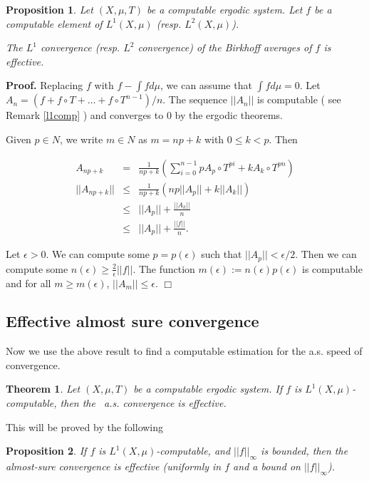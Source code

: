 \documentclass[copyright,creativecommons]{eptcs}
\newtheorem{theorem}{Theorem}
\newtheorem{proposition}{Proposition}
\numberwithin{equation}{section}
\begin{document}
\begin{proposition}
Let $(X,\mu ,T)$ be a computable ergodic system. Let $f$ be a computable
element of $L^{1}(X,\mu )$ (resp. $L^{2}(X,\mu )$).

The $L^1$ convergence (resp. $L^2$ convergence) of the Birkhoff averages of $f$ is effective.
\end{proposition}

{\bf Proof.}
Replacing $f$ with $f-\int fd\mu $, we can assume that $\int fd\mu =0$.
Let $A_{n}=(f+f\circ T+\ldots +f\circ T^{n-1})/n$. The sequence $||A_{n}||$
is computable ( see Remark \ref{l1comp} ) and converges to $0$ by the ergodic
theorems.

Given $p\in N$, we write $m\in N$ as $m=np+k$ with $0\leq k<p$. Then

\begin{eqnarray*}
A_{np+k} &=&\frac{1}{np+k}\left( \sum_{i=0}^{n-1}pA_{p}\circ
T^{pi}+kA_{k}\circ T^{pn}\right) \\
||A_{np+k}|| &\leq &\frac{1}{np+k}(np||A_{p}||+k||A_{k}||) \\
&\leq &||A_{p}||+\frac{||{A_{k}}||}{n} \\
&\leq &||{A_{p}}||+\frac{||{f}||}{n}.
\end{eqnarray*}

Let $\epsilon >0$. We can compute some $p=p(\epsilon )$ such that $||{A_{p}}||<\epsilon /2$. Then we can compute some $n(\epsilon )\geq \frac{2}{\epsilon }||{f}||$. The function $m(\epsilon ):=n(\epsilon )p(\epsilon )$ is
computable and for all $m\geq m(\epsilon )$, $||{A_{m}}||\leq \epsilon $.
$\Box$

\subsection{Effective almost sure convergence}

Now we use the above result to find a computable estimation for the a.s.
speed of convergence.

\begin{theorem}
\label{corollaryx}Let $(X,\mu ,T)$ be a computable ergodic system. If $f$ is
$L^{1}(X,\mu )$-computable, then the \ a.s. convergence is effective.
\end{theorem}

This will be proved by the following

\begin{proposition}
\label{theorem_ergodic_effective_as_convergence} If $f$ is $L^{1}(X,\mu )$-computable, and $||{f}||_{\infty }$ is bounded, then
the almost-sure convergence is effective (uniformly in $f$ and a bound on  $||{f}||_{\infty }$). 
\end{proposition}
\end{document}
